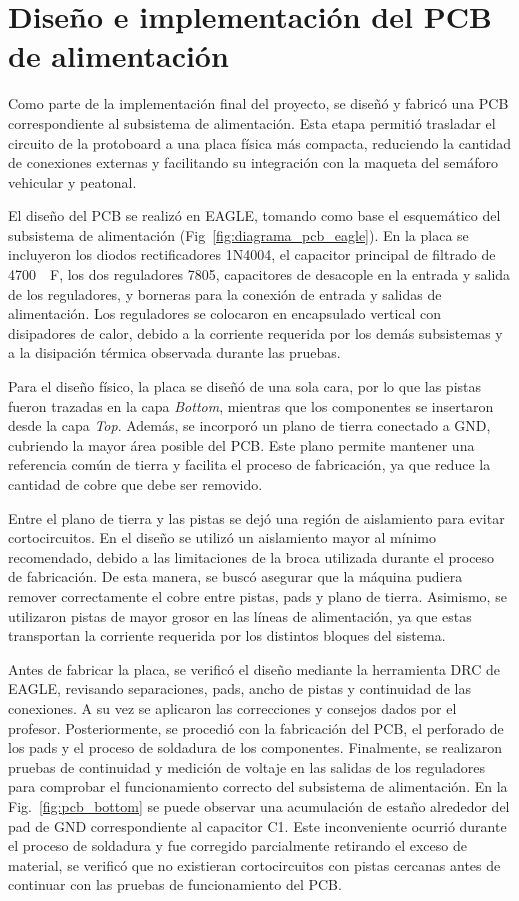 \documentclass[12pt,onecolumn]{IEEEtran}
\begin{document}
\section{Diseño e implementación del PCB de alimentación}

Como parte de la implementación final del proyecto, se diseñó y fabricó una PCB correspondiente al subsistema de alimentación. Esta etapa permitió trasladar el circuito de la protoboard a una placa física más compacta, reduciendo la cantidad de conexiones externas y facilitando su integración con la maqueta del semáforo vehicular y peatonal.

El diseño del PCB se realizó en EAGLE, tomando como base el esquemático del subsistema de alimentación (Fig~\ref{fig:diagrama_pcb_eagle}). En la placa se incluyeron los diodos rectificadores 1N4004, el capacitor principal de filtrado de \qty{4700}{\mu F}, los dos reguladores 7805, capacitores de desacople en la entrada y salida de los reguladores, y borneras para la conexión de entrada y salidas de alimentación. Los reguladores se colocaron en encapsulado vertical con disipadores de calor, debido a la corriente requerida por los demás subsistemas y a la disipación térmica observada durante las pruebas.

Para el diseño físico, la placa se diseñó de una sola cara, por lo que las pistas fueron trazadas en la capa \textit{Bottom}, mientras que los componentes se insertaron desde la capa \textit{Top}. Además, se incorporó un plano de tierra conectado a GND, cubriendo la mayor área posible del PCB. Este plano permite mantener una referencia común de tierra y facilita el proceso de fabricación, ya que reduce la cantidad de cobre que debe ser removido.

Entre el plano de tierra y las pistas se dejó una región de aislamiento para evitar cortocircuitos. En el diseño se utilizó un aislamiento mayor al mínimo recomendado, debido a las limitaciones de la broca utilizada durante el proceso de fabricación. De esta manera, se buscó asegurar que la máquina pudiera remover correctamente el cobre entre pistas, pads y plano de tierra. Asimismo, se utilizaron pistas de mayor grosor en las líneas de alimentación, ya que estas transportan la corriente requerida por los distintos bloques del sistema.

Antes de fabricar la placa, se verificó el diseño mediante la herramienta DRC de EAGLE, revisando separaciones, pads, ancho de pistas y continuidad de las conexiones. A su vez se aplicaron las correcciones y consejos dados por el profesor. Posteriormente, se procedió con la fabricación del PCB, el perforado de los pads y el proceso de soldadura de los componentes. Finalmente, se realizaron pruebas de continuidad y medición de voltaje en las salidas de los reguladores para comprobar el funcionamiento correcto del subsistema de alimentación.  En la Fig.~\ref{fig:pcb_bottom} se puede observar una acumulación de estaño alrededor del pad de GND correspondiente al capacitor C1. Este inconveniente ocurrió durante el proceso de soldadura y fue corregido parcialmente retirando el exceso de material, se verificó que no existieran cortocircuitos con pistas cercanas antes de continuar con las pruebas de funcionamiento del PCB.
\end{document}
